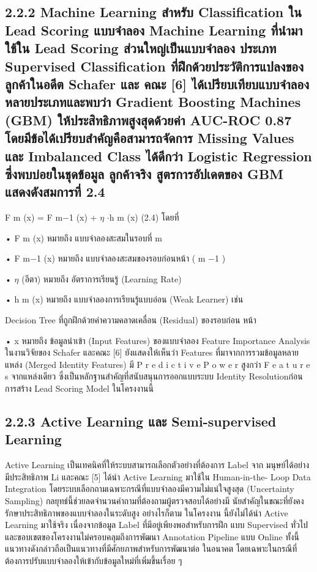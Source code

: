 \documentclass[12pt,a4paper]{report}
\begin{document}
\subsection*{2.2.2 Machine Learning สำหรับ Classification ใน Lead Scoring แบบจำลอง Machine Learning ที่นำมาใช้ใน Lead Scoring ส่วนใหญ่เป็นแบบจำลอง ประเภท Supervised Classification ที่ฝึกด้วยประวัติการแปลงของลูกค้าในอดีต Schafer และ คณะ [6] ได้เปรียบเทียบแบบจำลองหลายประเภทและพบว่า Gradient Boosting Machines (GBM) ให้ประสิทธิภาพสูงสุดด้วยค่า AUC-ROC 0.87 โดยมีข้อได้เปรียบสำคัญคือสามารถจัดการ Missing Values และ Imbalanced Class ได้ดีกว่า Logistic Regression ซึ่งพบบ่อยในชุดข้อมูล ลูกค้าจริง สูตรการอัปเดตของ GBM แสดงดังสมการที่ 2.4}
F m (x) = F m−1 (x) + \ensuremath{\eta} \ensuremath{\cdot}h m (x) (2.4) โดยที่\par
\noindent • F m (x) หมายถึง แบบจำลองสะสมในรอบที่ m\par
\noindent • F m−1 (x) หมายถึง แบบจำลองสะสมของรอบก่อนหน้า ( m −1 )\par
\noindent • \ensuremath{\eta} (อีตา) หมายถึง อัตราการเรียนรู้ (Learning Rate)\par
\noindent • h m (x) หมายถึง แบบจำลองการเรียนรู้แบบอ่อน (Weak Learner) เช่น\par
Decision Tree ที่ถูกฝึกด้วยค่าความคลาดเคลื่อน (Residual) ของรอบก่อน หน้า\par
\noindent • x หมายถึง ข้อมูลนำเข้า (Input Features) ของแบบจำลอง Feature Importance Analysis ในงานวิจัยของ Schafer และคณะ [6] ยังแสดงให้เห็นว่า Features ที่มาจากการรวมข้อมูลหลายแหล่ง (Merged Identity Features) มี P r e d i c t i v e P o w e r สูงกว่า F e a t u r e s จากแหล่งเดียว ซึ่งเป็นหลักฐานสำคัญที่สนับสนุนการออกแบบระบบ Identity Resolutionก่อนการสร้าง Lead Scoring Model ในโครงงานนี้\par
\subsection*{2.2.3 Active Learning และ Semi-supervised Learning}
Active Learning เป็นเทคนิคที่ให้ระบบสามารถเลือกตัวอย่างที่ต้องการ Label จาก มนุษย์ได้อย่างมีประสิทธิภาพ Li และคณะ [5] ได้นำ Active Learning มาใช้ใน Human-in-the- Loop Data Integration โดยระบบเลือกถามเฉพาะกรณีที่แบบจำลองมีความไม่แน่ใจสูงสุด (Uncertainty Sampling) กลยุทธ์นี้ช่วยลดจำนวนคำถามที่ต้องถามผู้ตรวจสอบได้อย่างมี นัยสำคัญในขณะที่ยังคงรักษาประสิทธิภาพของแบบจำลองในระดับสูง อย่างไรก็ตาม ในโครงงาน นี้ยังไม่ได้นำ Active Learning มาใช้จริง เนื่องจากข้อมูล Label ที่มีอยู่เพียงพอสำหรับการฝึก แบบ Supervised ทั่วไป และขอบเขตของโครงงานไม่ครอบคลุมถึงการพัฒนา Annotation Pipeline แบบ Online ทั้งนี้ แนวทางดังกล่าวถือเป็นแนวทางที่มีศักยภาพสำหรับการพัฒนาต่อ ในอนาคต โดยเฉพาะในกรณีที่ต้องการปรับแบบจำลองให้เข้ากับข้อมูลใหม่ที่เพิ่มขึ้นเรื่อย ๆ\par
\clearpage
\end{document}
